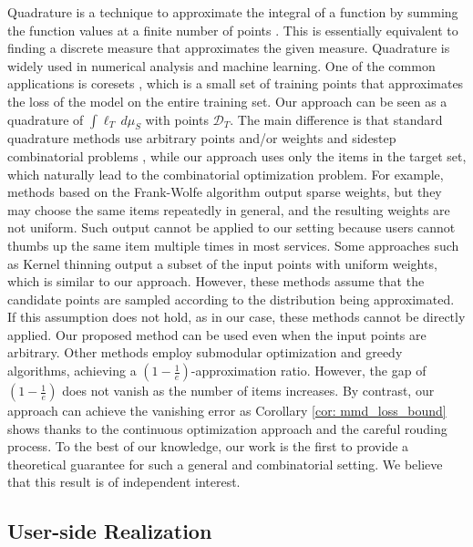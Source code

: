 Quadrature is a technique to approximate the integral of a function by summing the function values at a finite number of points \cite{rasmussen2002bayesian, huszar2012optimally, harvey2014near, equivalence2017bach, hayakawa2022positively}. This is essentially equivalent to finding a discrete measure that approximates the given measure. Quadrature is widely used in numerical analysis and machine learning. One of the common applications is coresets \cite{karnin2019discrepancy, sener2018active, campbell2019automated, mirzasoleiman2020coresets}, which is a small set of training points that approximates the loss of the model on the entire training set. Our approach can be seen as a quadrature of $\int \ell_T \, d\mu_S$ with points $\mathcal{D}_T$. The main difference is that standard quadrature methods use arbitrary points and/or weights and sidestep combinatorial problems \cite{back2012equivalence, briol2015frank}, while our approach uses only the items in the target set, which naturally lead to the combinatorial optimization problem. For example, methods based on the Frank-Wolfe algorithm \cite{welling2009herding, chen2010super, back2012equivalence} output sparse weights, but they may choose the same items repeatedly in general, and the resulting weights are not uniform. Such output cannot be applied to our setting because users cannot thumbs up the same item multiple times in most services. Some approaches \cite{karnin2019discrepancy, dwivedi2024kernel} such as Kernel thinning \cite{dwivedi2024kernel} output a subset of the input points with uniform weights, which is similar to our approach. However, these methods assume that the candidate points are sampled according to the distribution being approximated. If this assumption does not hold, as in our case, these methods cannot be directly applied. Our proposed method can be used even when the input points are arbitrary. Other methods \cite{wei2013using, wei2015submodularity} employ submodular optimization and greedy algorithms, achieving a $(1 - \frac{1}{e})$-approximation ratio. However, the gap of $(1 - \frac{1}{e})$ does not vanish as the number of items increases. By contrast, our approach can achieve the vanishing error as Corollary \ref{cor: mmd_loss_bound} shows thanks to the continuous optimization approach and the careful rouding process. To the best of our knowledge, our work is the first to provide a theoretical guarantee for such a general and combinatorial setting. We believe that this result is of independent interest.

\subsection{User-side Realization}


